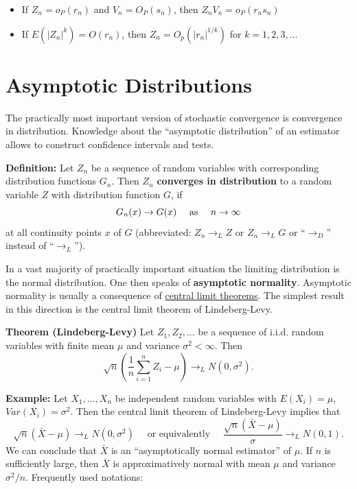 \documentclass[]{book}
\providecommand{\tightlist}{%
  \setlength{\itemsep}{0pt}\setlength{\parskip}{0pt}}
\theoremstyle{definition}
\theoremstyle{definition}
\theoremstyle{definition}
\theoremstyle{remark}
\begin{document}
\begin{itemize}
\tightlist
\item
  If \(Z_n=o_P(r_n)\) and \(V_n=O_P(s_n)\), then \(Z_nV_n=o_P(r_n s_n)\)
\end{itemize}

\begin{itemize}
\tightlist
\item
  If \(E(|Z_n|^k)=O(r_n)\), then \(Z_n=O_p(|r_n|^{1/k})\) for \(k=1,2,3,\dots\)
\end{itemize}

\hypertarget{asymptotic-distributions}{%
\section{Asymptotic Distributions}\label{asymptotic-distributions}}

The practically most important version of stochastic convergence is convergence in distribution. Knowledge about the ``asymptotic distribution'' of an estimator allows to construct confidence intervals and tests.

\textbf{Definition:} Let \(Z_n\) be a sequence of random variables with corresponding distribution functions \(G_n\). Then \(Z_n\) \textbf{converges in distribution} to a random variable \(Z\) with distribution function \(G\), if
\[G_n(x)\to G(x)\quad\hbox{ as }\quad n\to\infty \]
at all continuity points \(x\) of \(G\) (abbreviated: \(Z_n\to_L Z\) or \(Z_n\to_L G\) or ``\(\to_D\)'' instead of ``\(\to_L\)'').

In a vast majority of practically important situation the limiting distribution is the normal distribution. One then speaks of \textbf{asymptotic normality}. Asymptotic normality is usually a consequence of \href{https://www.statlect.com/asymptotic-theory/central-limit-theorem\%5D}{central limit theorems}. The simplest result in this direction is the central limit theorem of Lindeberg-Levy.

\textbf{Theorem (Lindeberg-Levy)} Let \(Z_1,Z_2,\dots\) be a sequence of i.i.d. random variables with
finite mean \(\mu\) and variance \(\sigma^2<\infty\). Then
\[\sqrt{n}\left(\frac{1}{n} \sum_{i=1}^n Z_i -\mu\right)\rightarrow_L N(0,\sigma^2).\]

\textbf{Example:} Let \(X_1,\dots,X_n\) be independent random variables
with \(E(X_i)=\mu\), \(Var(X_i)=\sigma^2\). Then the central limit theorem of Lindeberg-Levy implies that
\[\sqrt{n}(\bar X -\mu ) \to_L N(0,\sigma^2)\quad\text{ or equivalently }\quad
\frac{\sqrt{n}(\bar X -\mu )}{\sigma}\to_L N(0,1).\]
We can conclude that \(\bar X\) is an ``asymptotically normal estimator'' of \(\mu\). If \(n\) is sufficiently large, then \(\bar X\) is approximatively normal with mean \(\mu\) and variance \(\sigma^2/n\). Frequently used notations:
\end{document}
